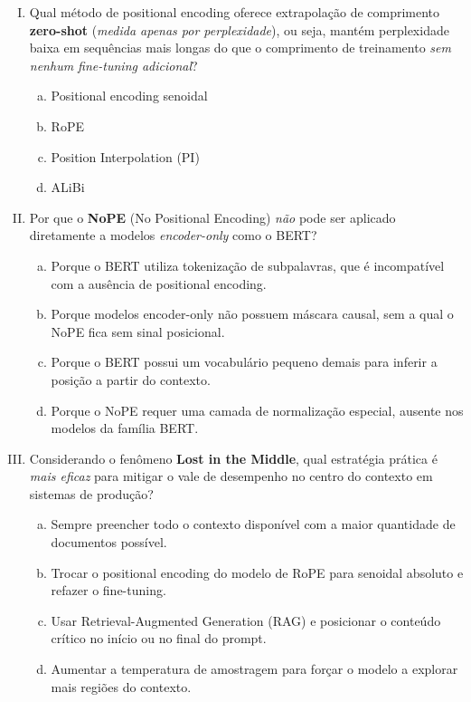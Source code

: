\documentclass{dlproblemset}
\begin{document}
\begin{enumerate}[I)]
\item Qual método de positional encoding oferece extrapolação de comprimento
      \textbf{zero-shot} (\emph{medida apenas por perplexidade}), ou seja,
      mantém perplexidade baixa em sequências mais longas do que o
      comprimento de treinamento \emph{sem nenhum fine-tuning adicional}?

\begin{enumerate}[a)]
    \item Positional encoding senoidal
    \item RoPE
    \item Position Interpolation (PI)
    \item ALiBi
\end{enumerate}

\item Por que o \textbf{NoPE} (No Positional Encoding) \emph{não} pode ser aplicado
      diretamente a modelos \emph{encoder-only} como o BERT?

\begin{enumerate}[a)]
    \item Porque o BERT utiliza tokenização de subpalavras, que é incompatível
          com a ausência de positional encoding.
    \item Porque modelos encoder-only não possuem máscara causal, sem a qual o
          NoPE fica sem sinal posicional.
    \item Porque o BERT possui um vocabulário pequeno demais para inferir a
          posição a partir do contexto.
    \item Porque o NoPE requer uma camada de normalização especial, ausente nos
          modelos da família BERT.
\end{enumerate}

\item Considerando o fenômeno \textbf{Lost in the Middle}, qual estratégia prática
      é \emph{mais eficaz} para mitigar o vale de desempenho no centro do contexto
      em sistemas de produção?

\begin{enumerate}[a)]
    \item Sempre preencher todo o contexto disponível com a maior quantidade de
          documentos possível.
    \item Trocar o positional encoding do modelo de RoPE para senoidal absoluto
          e refazer o fine-tuning.
    \item Usar Retrieval-Augmented Generation (RAG) e posicionar o conteúdo
          crítico no início ou no final do prompt.
    \item Aumentar a temperatura de amostragem para forçar o modelo a explorar
          mais regiões do contexto.
\end{enumerate}


\end{enumerate}
\end{document}
